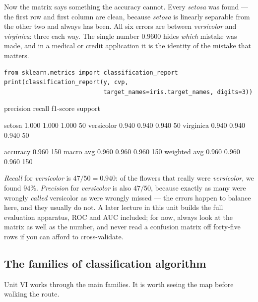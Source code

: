 \documentclass[11pt]{article}
\begin{document}
Now the matrix says something the accuracy cannot. Every \emph{setosa} was
found --- the first row and first column are clean, because \emph{setosa} is
linearly separable from the other two and always has been. All six errors are
between \emph{versicolor} and \emph{virginica}: three each way. The single
number $0.9600$ hides \emph{which} mistake was made, and in a medical or
credit application it is the identity of the mistake that matters.

\begin{lstlisting}
from sklearn.metrics import classification_report
print(classification_report(y, cvp,
                            target_names=iris.target_names, digits=3))
\end{lstlisting}
\begin{codeout}
              precision    recall  f1-score   support

      setosa      1.000     1.000     1.000        50
  versicolor      0.940     0.940     0.940        50
   virginica      0.940     0.940     0.940        50

    accuracy                          0.960       150
   macro avg      0.960     0.960     0.960       150
weighted avg      0.960     0.960     0.960       150
\end{codeout}

\emph{Recall} for \emph{versicolor} is $47/50 = 0.940$: of the flowers that
really were \emph{versicolor}, we found $94\%$. \emph{Precision} for
\emph{versicolor} is also $47/50$, because exactly as many were wrongly
\emph{called} versicolor as were wrongly missed --- the errors happen to
balance here, and they usually do not. A later lecture in this unit builds the
full evaluation apparatus, ROC and AUC included; for now, always look at the
matrix as well as the number, and never read a confusion matrix off
forty-five rows if you can afford to cross-validate.

\subsection{The families of classification algorithm}
\label{sec:families}

Unit VI works through the main families. It is worth seeing the map before
walking the route.
\end{document}

